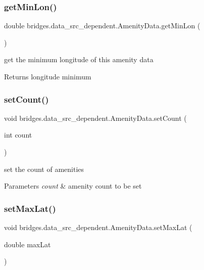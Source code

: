 \subsubsection{\texorpdfstring{get\+Min\+Lon()}{getMinLon()}}
{\footnotesize\ttfamily double bridges.\+data\+\_\+src\+\_\+dependent.\+Amenity\+Data.\+get\+Min\+Lon (\begin{DoxyParamCaption}{ }\end{DoxyParamCaption})}

get the minimum longitude of this amenity data \begin{DoxyReturn}{Returns}
longitude minimum 
\end{DoxyReturn}
\mbox{\label{classbridges_1_1data__src__dependent_1_1_amenity_data_a968e067892dc694555c0ba8e5a75c3cf}} 
\subsubsection{\texorpdfstring{set\+Count()}{setCount()}}
{\footnotesize\ttfamily void bridges.\+data\+\_\+src\+\_\+dependent.\+Amenity\+Data.\+set\+Count (\begin{DoxyParamCaption}\item[{int}]{count }\end{DoxyParamCaption})}

set the count of amenities 
\begin{DoxyParams}{Parameters}
{\em count} & amenity count to be set \\
\hline
\end{DoxyParams}
\mbox{\label{classbridges_1_1data__src__dependent_1_1_amenity_data_ab6a9a4a895d769b2d2d57172ee92537f}} 
\subsubsection{\texorpdfstring{set\+Max\+Lat()}{setMaxLat()}}
{\footnotesize\ttfamily void bridges.\+data\+\_\+src\+\_\+dependent.\+Amenity\+Data.\+set\+Max\+Lat (\begin{DoxyParamCaption}\item[{double}]{max\+Lat }\end{DoxyParamCaption})}

